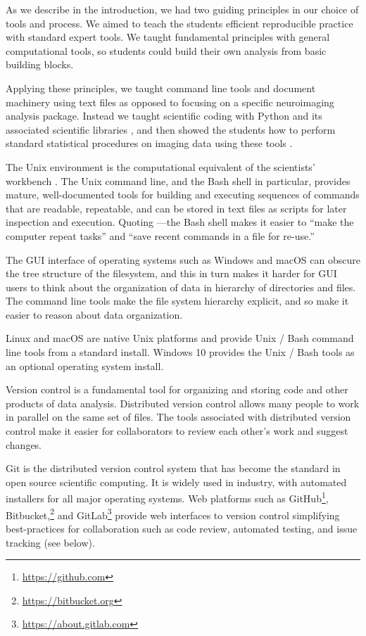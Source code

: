 As we describe in the introduction, we had two guiding principles in our
choice of tools and process.  We aimed to teach the students efficient
reproducible practice with standard expert tools.  We taught fundamental
principles with general computational tools, so students could build their own
analysis from basic building blocks.

Applying these principles, we taught command line tools and document machinery
using text files as opposed to focusing on a specific
neuroimaging analysis package. Instead we taught scientific coding with Python
and its associated scientific libraries \citep{millman2011python,
perez2011python}, and then showed the students how to perform standard
statistical procedures on imaging data using these tools
\citep{millman2007analysis}.

The Unix environment is the computational equivalent of the scientists'
workbench \citep{preeyanon2014reproducible}.  The Unix command line, and the
Bash shell in particular, provides mature, well-documented tools for building
and executing sequences of commands that are readable, repeatable, and can be
stored in text files as scripts for later inspection and execution.  Quoting
\cite{wilson2014best}---the Bash shell makes it easier to ``make the computer
repeat tasks'' and ``save recent commands in a file for re-use.''

The GUI interface of operating systems such as Windows and macOS can obscure
the tree structure of the filesystem, and this in turn makes it harder for GUI
users to think about the organization of data in hierarchy of directories and
files.  The command line tools make the file system hierarchy explicit, and so
make it easier to reason about data organization.

Linux and macOS are native Unix platforms and provide Unix / Bash command line
tools from a standard install.  Windows 10 provides the Unix / Bash tools as
an optional operating system install.

Version control is a fundamental tool for organizing and storing code and
other products of data analysis.
Distributed version control allows many people to work in parallel on the
same set of files.
The tools associated with distributed version control make it easier for
collaborators to review each other's work and suggest changes.

Git is the distributed version control system that has become the standard in
open source scientific computing. It is widely used in industry, with automated
installers for all major operating systems.
Web platforms such as GitHub\footnote{\url{https://github.com}},
Bitbucket,\footnote{\url{https://bitbucket.org}} and
GitLab\footnote{\url{https://about.gitlab.com}} provide web interfaces to
version control simplifying best-practices for collaboration such as code
review, automated testing, and issue tracking (see below).

